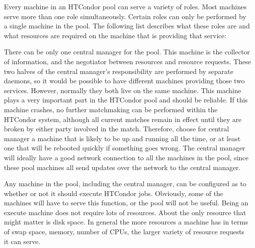 Every machine in an HTCondor pool can serve a variety of roles.  Most
machines serve more than one role simultaneously.  Certain roles can
only be performed by a single machine in the pool.  The following list
describes what these roles are and what resources are required on the
machine that is providing that service:

\begin{description} 

\item[Central Manager] There can be only one central manager for the pool.
This machine is the collector of information, and the negotiator
between resources and resource requests.  These two halves of the
central manager's responsibility are performed by separate daemons, so
it would be possible to have different machines providing those two
services.  However, normally they both live on the same machine.  This
machine plays a very important part in the HTCondor pool and should be
reliable.  If this machine crashes, no further matchmaking can be
performed within the HTCondor system,
although all current matches remain in effect until they are broken 
by either party involved in the match.
Therefore, choose for central manager
a machine that is likely to be up and running all the time, 
or at least one that will be rebooted quickly if something goes wrong.
The central manager will
ideally have a good network connection to all the
machines in the pool, since these pool machines all send updates over 
the network to the central manager. 


\item[Execute] Any machine in the pool, 
including the central manager, 
can be configured as to whether or not it should execute HTCondor jobs.
Obviously, some of the machines will have to serve this
function, or the pool will not be useful.
Being an execute machine does not require lots of resources.  
About the only resource that might matter is disk space.
In general the
more resources a machine has in terms of swap space, memory, number of CPUs, 
the larger variety of resource requests it can serve.


\end{description}
